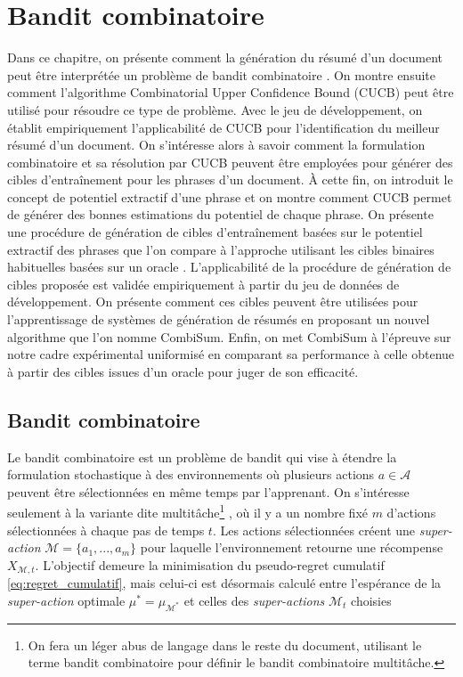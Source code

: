 \chapter{Bandit combinatoire}
\label{chap:bandit_combi}                   %

Dans ce chapitre, on présente comment la génération du résumé d'un document
peut être interprétée un problème de bandit combinatoire \citep{pmlr-v28-chen13a}.
On montre ensuite comment l'algorithme Combinatorial Upper Confidence Bound (CUCB) 
\citep{pmlr-v28-chen13a} peut être utilisé pour résoudre ce type de problème.
Avec le jeu de développement, on établit empiriquement l'applicabilité 
de CUCB pour l'identification du meilleur résumé d'un document.
On s'intéresse alors à savoir comment la formulation combinatoire et sa résolution 
par CUCB peuvent être employées pour générer des cibles d'entraînement 
pour les phrases d'un document.
À cette fin, on introduit le concept de potentiel extractif d'une phrase
et on montre comment CUCB permet de générer des bonnes 
estimations du potentiel de chaque phrase.
On présente une procédure de génération de cibles d'entraînement 
basées sur le potentiel extractif des phrases que l'on compare 
à l'approche utilisant les cibles binaires habituelles basées sur un oracle \citep{10.5555/3298483.3298681}.
L'applicabilité de la procédure de génération de cibles proposée 
est validée empiriquement à partir du jeu de données de développement.
On présente comment ces cibles peuvent être utilisées pour 
l'apprentissage de systèmes de génération de résumés en proposant 
un nouvel algorithme que l'on nomme CombiSum.
Enfin, on met CombiSum à l'épreuve sur notre cadre expérimental 
uniformisé en comparant sa performance à celle obtenue à partir des cibles 
issues d'un oracle pour juger de son efficacité.

\section{Bandit combinatoire}
\label{section:formulation_combi}

Le bandit combinatoire est un problème de bandit qui vise à étendre
la formulation stochastique à des environnements où plusieurs actions
$a \in \mathcal{A}$ peuvent être sélectionnées
en même temps par l'apprenant.
On s'intéresse seulement à la variante dite multitâche\footnote{On fera 
un léger abus de langage dans le reste du document, utilisant le terme 
bandit combinatoire pour définir le bandit combinatoire multitâche.} \citep{banditalgs}, où
il y a un nombre fixé $m$ d'actions sélectionnées à
chaque pas de temps $t$.
Les actions sélectionnées créent une \textit{super-action} $\mathcal{M} = \{a_1, ..., a_m\}$
pour laquelle l'environnement retourne une récompense $X_{\mathcal{M}, t}$.
L'objectif demeure la minimisation du pseudo-regret cumulatif \eqref{eq:regret_cumulatif}, 
mais celui-ci est désormais calculé entre l'espérance de
la \textit{super-action} optimale $\mu^* = \mu_{\mathcal{M}^*}$ et celles des \textit{super-actions} 
$\mathcal{M}_t$ choisies

